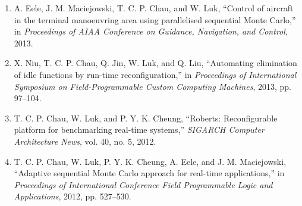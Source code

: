 \begin{publications}
\begin{enumerate}[I]
\item A. Eele, J. M. Maciejowski, T. C. P. Chau, and W. Luk, ``Control of aircraft in the terminal manoeuvring area using parallelised sequential Monte Carlo,'' in \textit{Proceedings of AIAA Conference on Guidance, Navigation, and Control}, 2013.
\item X. Niu, T. C. P. Chau, Q. Jin, W. Luk, and Q. Liu, ``Automating elimination of idle functions by run-time reconfiguration,'' in \textit{Proceedings of International Symposium on Field-Programmable Custom Computing Machines}, 2013, pp. 97–104.
\item T. C. P. Chau, W. Luk, and P. Y. K. Cheung, ``Roberts: Reconfigurable platform for benchmarking real-time systems,'' \textit{SIGARCH Computer Architecture News}, vol. 40, no. 5, 2012.
\item T. C. P. Chau, W. Luk, P. Y. K. Cheung, A. Eele, and J. M. Maciejowski, ``Adaptive sequential Monte Carlo approach for real-time applications,'' in \textit{Proceedings of International Conference Field Programmable Logic and Applications}, 2012, pp. 527–530.
\end{enumerate}

\end{publications}
